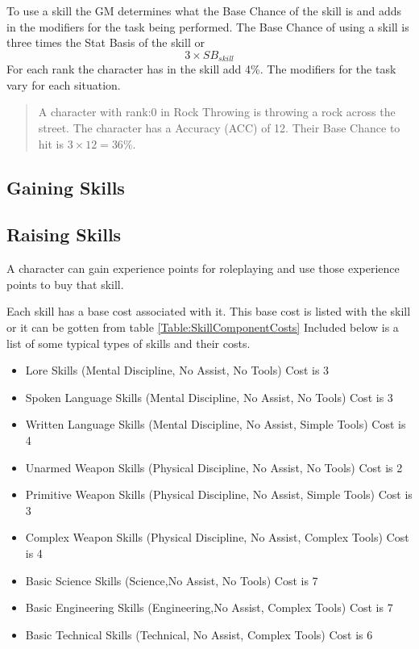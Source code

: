 To use a skill the GM determines what the Base Chance of the skill is 
and adds in the modifiers for the task being performed.
The Base Chance of using a skill is three times the Stat Basis of the skill
or \[ 3 \times SB_{skill} \] For each rank the character has in the skill add 4\%.
The modifiers for the task vary for each situation.

\begin{quote}
A character with rank:0 in Rock Throwing is throwing a rock 
across the street. The character has a Accuracy (ACC) of 12. Their Base Chance 
to hit is \( 3 \times 12 = 36\% \).
\end{quote}

\subsection{Gaining Skills}

\subsection{Raising Skills}

A character can gain experience points for roleplaying and use those
experience points to buy that skill.



Each skill has a base cost associated with it. This base cost is listed
with the skill or it can be gotten from table
\ref{Table:SkillComponentCosts} Included below is a list of some typical types of skills and their costs.

\begin{itemize}
	\item Lore Skills {\small (Mental Discipline, No Assist, No Tools)} Cost is 3
	\item Spoken Language Skills {\small (Mental Discipline, No Assist, No Tools)} Cost is 3
	\item Written Language Skills {\small (Mental Discipline, No Assist, Simple Tools)} Cost is 4
	\item Unarmed Weapon Skills {\small (Physical Discipline, No Assist, No Tools)} Cost is 2
	\item Primitive Weapon Skills {\small (Physical Discipline, No Assist, Simple Tools)} Cost is 3
	\item Complex Weapon Skills {\small (Physical Discipline, No Assist, Complex Tools)} Cost is 4
	\item Basic Science Skills {\small (Science,No Assist, No Tools)} Cost is 7
	\item Basic Engineering Skills {\small (Engineering,No Assist, Complex Tools)} Cost is 7
	\item Basic Technical Skills {\small (Technical, No Assist, Complex Tools)} Cost is 6
\end{itemize}


